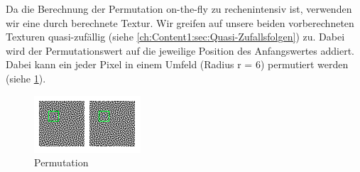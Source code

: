 Da die Berechnung der Permutation \glqq on-the-fly\grqq{} zu rechenintensiv ist, verwenden wir eine durch 
 berechnete Textur.
Wir greifen auf unsere beiden vorberechneten Texturen quasi-zufällig (siehe \ref{ch:Content1:sec:Quasi-Zufallsfolgen})
zu. Dabei wird der Permutationswert auf die jeweilige Position des Anfangswertes addiert.
Dabei kann ein jeder Pixel in einem Umfeld (Radius r = 6) permutiert werden (siehe \ref{pic:Permutation}).

\begin{figure}[H]
    \centering
    \includegraphics[width=0.5\linewidth]{content/simulatedAnnealing/Bilder/Permutation.png}
    \caption{Permutation}
    \label{pic:Permutation}
\end{figure}

\newpage

